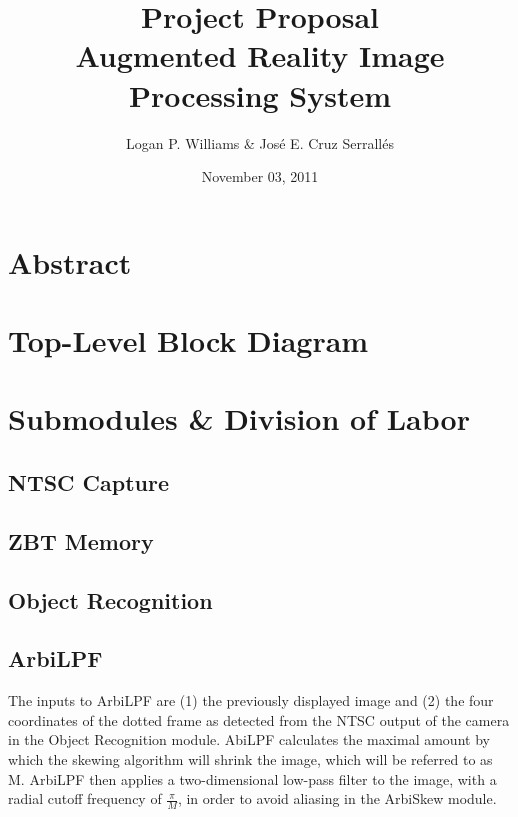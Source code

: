 \documentclass{article}
\begin{document}
\title{Project Proposal\\Augmented Reality Image Processing System}
\author{Logan P. Williams \& Jos\'{e} E. Cruz Serrall\'{e}s}
\date{November 03, 2011}
\maketitle

\section{Abstract}

\section{Top-Level Block Diagram}

\section{Submodules \& Division of Labor}
\subsection{NTSC Capture}

\subsection{ZBT Memory}

\subsection{Object Recognition}

\subsection{ArbiLPF}
The inputs to ArbiLPF are (1) the previously displayed image and (2) the four coordinates of the dotted frame as detected from the NTSC output of the camera in the Object Recognition module. AbiLPF calculates the maximal amount by which the skewing algorithm will shrink the image, which will be referred to as M. ArbiLPF then applies a two-dimensional low-pass filter to the image, with a radial cutoff frequency of \( \frac{\pi}{M} \), in order to avoid aliasing in the ArbiSkew module.
\end{document}
